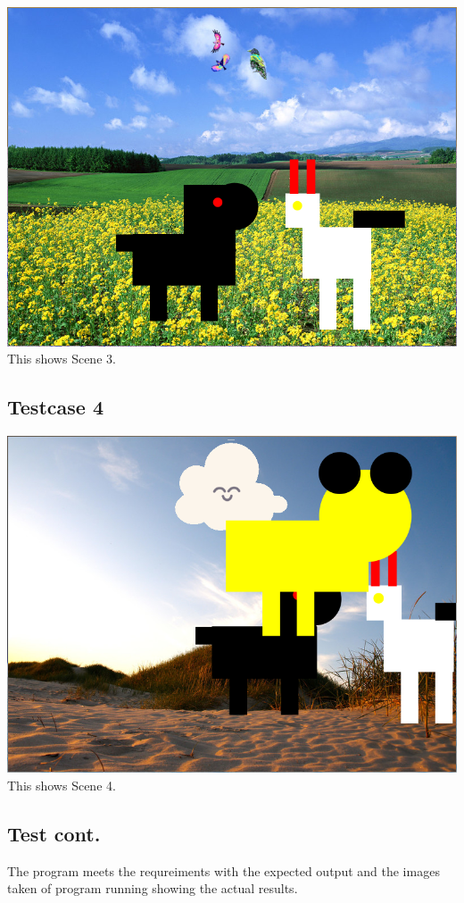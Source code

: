 \documentclass{article}
\begin{document}
\includegraphics[scale=0.5]{Scene3.png}
\newline This shows Scene 3.
\newpage\subsection{Testcase 4}
\includegraphics[scale=0.5]{Scene4.png}
\newline This shows Scene 4.
\newpage\subsection{Test cont.} 
The program meets the requreiments with the expected output and the images taken 
of program running showing the actual results.
\end{document}
